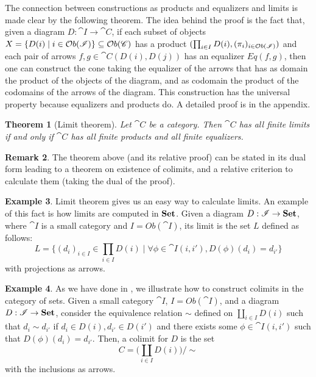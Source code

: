 \documentclass[a4paper, twoside,openright]{report}
\theoremstyle{plain}
\newtheorem{theorem}{Theorem}[section]
\theoremstyle{definition}
\newtheorem{example}[theorem]{Example}
\newtheorem{remark}[theorem]{Remark}
\begin{document}
The connection between constructions as products and equalizers and limits is made clear by the following theorem. The idea behind the proof is the fact that, given a diagram $D : \cat I \rightarrow \cat C$, if each subset of objects $X = \{D(i) \mid i \in \mathcal{O}b(\mathscr{I})\} \subseteq \mathcal{O}b(\mathscr{C})$ has a product $(\prod_{i \in I} D(i), (\pi_i)_{i \in \mathcal{O}b( \mathscr{I})})$ and each pair of arrows $f, g \in \cat C (D(i), D(j))$ has an equalizer $Eq(f, g)$, then one can construct the cone taking the equalizer of the arrows that has as domain the product of the objects of the diagram, and as codomain the product of the codomains of the arrows of the diagram. This construction has the universal property because equalizers and products do. A detailed proof is in the appendix.

\begin{theorem}[Limit theorem]\label{th:limit}
    Let $\cat C$ be a category. Then $\cat C$ has all finite limits if and only if $\cat C$ has all finite products and all finite equalizers.
\end{theorem}

\begin{remark}
    The theorem above (and its relative proof) can be stated in its dual form leading to a theorem on existence of colimits, and a relative criterion to calculate them (taking the dual of the proof).
\end{remark}

\begin{example}\label{ex:lim_of_sets}
    Limit theorem gives us an easy way to calculate limits. An example of this fact is how limits are computed in $\mathbf{Set}$. Given a diagram $D: \mathscr{I} \rightarrow \mathbf{Set}$, where $\cat I$ is a small category and $I = Ob(\cat I)$, its limit is the set $L$ defined as follows:
    $$
        L = \{ (d_i)_{i \in I} \in \prod_{i \in I}D(i) \mid \forall \phi \in \cat I(i, i'), D(\phi)(d_i) = d_{i'} \}
    $$
    with projections as arrows.
\end{example}

\begin{example}\label{ex:colm_of_sets}
    As we have done in , we illustrate how to construct colimits in the category of sets. Given a small category $\cat I$, $ I = Ob(\cat I)$, and a diagram $D: \mathscr{I} \rightarrow \mathbf{Set}$, consider the equivalence relation $\sim$ defined on $\coprod_{i\in I} D(i)$ such that $d_i \sim d_{i'}$ if $d_i \in D(i), d_{i'} \in D(i')$ and there exists some $\phi \in \cat I(i, i')$ such that $D(\phi)(d_i) = d_{i'}$. Then, a colimit for $D$ is the set
    $$
        C = \big ( \coprod_{i \in I} D(i) \big ) / \sim
    $$
    with the inclusions as arrows.
\end{example}
\end{document}
